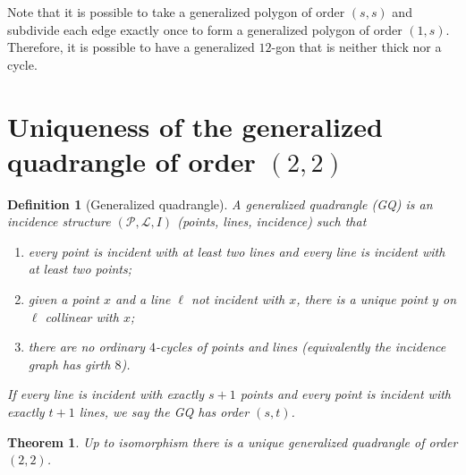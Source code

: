 \documentclass[12pt,a4paper,openany]{book}
\newtheorem{theorem}{Theorem}[section]
\newtheorem{definition}{Definition}[section]
\begin{document}
Note that it is possible to take a generalized polygon of order $(s, s)$ and subdivide each edge exactly once to form a generalized polygon of order $(1, s)$. Therefore, it is possible to have a generalized $12$-gon that is neither thick nor a cycle.



\section{Uniqueness of the generalized quadrangle of order $(2,2)$}

\begin{definition}[Generalized quadrangle]
A \emph{generalized quadrangle} (GQ) is an incidence structure $(\mathcal P,\mathcal L,I)$ (points, lines, incidence)
such that
\begin{enumerate}
  \item every point is incident with at least two lines and every line is incident with at least two points;
  \item given a point $x$ and a line $\ell$ not incident with $x$, there is a unique point $y$ on $\ell$ collinear with $x$;
  \item there are no ordinary $4$-cycles of points and lines (equivalently the incidence graph has girth $8$).
\end{enumerate}
If every line is incident with exactly $s+1$ points and every point is incident with exactly $t+1$ lines, we say the GQ has order $(s,t)$.
\end{definition}

\begin{theorem}
Up to isomorphism there is a unique generalized quadrangle of order $(2,2)$.
\end{theorem}
\end{document}
